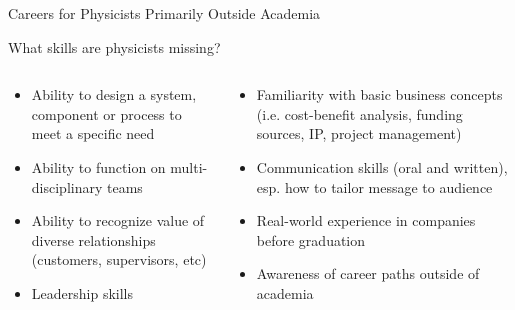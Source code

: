 \documentclass[xcolor=table,compress,professionalfonts,pdfpagelabels]{beamer}
\begin{document}
\begin{frame}{Careers for Physicists Primarily Outside Academia}
 \begin{block}{What skills are physicists missing?\footnotemark}
  \begin{columns}[T]
   \begin{column}{0.5\textwidth}
    \begin{itemize}
     \item Ability to design a system, component or process to meet a specific need
     \item Ability to function on multi-disciplinary teams
     \item Ability to recognize value of diverse relationships (customers, supervisors, etc)
     \item Leadership skills
    \end{itemize}
   \end{column}
   \begin{column}{0.5\textwidth}
    \begin{itemize}
     \item Familiarity with basic business concepts (i.e. cost-benefit analysis, funding sources, IP, project management)
     \item Communication skills (oral and written), esp. how to tailor message to audience
     \item Real-world experience in companies before graduation
     \item Awareness of career paths outside of academia
    \end{itemize}
   \end{column}
  \end{columns}
 \end{block}
\end{frame}
\end{document}
